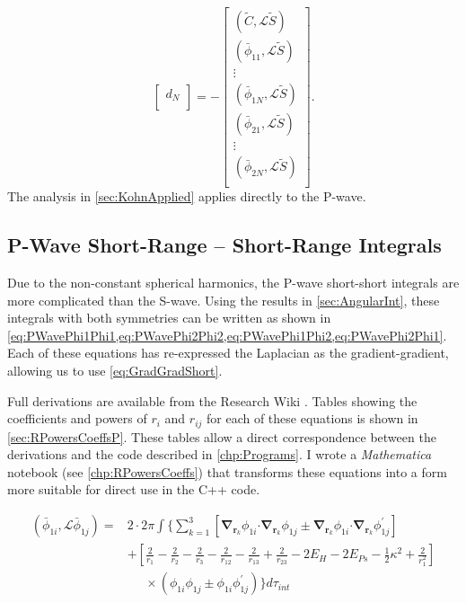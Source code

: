 \documentclass[Dissertation.tex]{subfiles}
\begin{document}
{\begin{equation}
\begin{bmatrix}
	d_N\\
	\end{bmatrix}
	= -
	\begin{bmatrix}
	(\widetilde{C},\mathcal{L}\widetilde{S}) \\
	(\bar{\phi}_{11},\mathcal{L}\widetilde{S}) \\
	\vdots \\
	(\bar{\phi}_{1N},\mathcal{L}\widetilde{S}) \\
	(\bar{\phi}_{21},\mathcal{L}\widetilde{S}) \\
	\vdots \\
	(\bar{\phi}_{2N},\mathcal{L}\widetilde{S}) \\
	\end{bmatrix}.
\end{equation}
}
The analysis in \cref{sec:KohnApplied} applies directly to the P-wave.


\subsection{P-Wave Short-Range -- Short-Range Integrals}
\label{sec:PWaveShortShort}

Due to the non-constant spherical harmonics, the P-wave short-short integrals
are more complicated than the S-wave. Using the results in \cref{sec:AngularInt},
these integrals with both symmetries can be written as shown in
\cref{eq:PWavePhi1Phi1,eq:PWavePhi2Phi2,eq:PWavePhi1Phi2,eq:PWavePhi2Phi1}.
Each of these equations has re-expressed the Laplacian as the gradient-gradient,
allowing us to use \cref{eq:GradGradShort}.

Full derivations are available from the Research Wiki \cite{Wiki}.
Tables showing the coefficients and powers of $r_i$ and $r_{ij}$ for each of 
these equations is shown in \cref{sec:RPowersCoeffsP}. These tables allow a 
direct correspondence between the derivations and the code described in
\cref{chp:Programs}. I wrote a \emph{Mathematica} notebook
(see \cref{chp:RPowersCoeffs}) that transforms
these equations into a form more suitable for direct use in the C++ code.


\begin{align}
\label{eq:PWavePhi1Phi1}
\left(\bar{\phi}_{1i},\mathcal{L} \bar{\phi}_{1j}\right) = &2 \cdot 2\pi \int{ \Bigg\{ \sum_{k=1}^3 \left[ \boldsymbol{\nabla}_{\!\mathbf{r}_k} \nonumber \phi_{1i} \boldsymbol{\cdot} \boldsymbol{\nabla}_{\!\mathbf{r}_k} \phi_{1j} \pm \boldsymbol{\nabla}_{\!\mathbf{r}_k} \phi_{1i} \boldsymbol{\cdot} \boldsymbol{\nabla}_{\!\mathbf{r}_k} \phi_{1j}^\prime \right] } \\
\nonumber  &+ \left. \left[\frac{2}{r_1} - \frac{2}{r_2} - \frac{2}{r_3} - \frac{2}{r_{12}} - \frac{2}{r_{13}} + \frac{2}{r_{23}} - 2 E_H - 2 E_{Ps} - \frac{1}{2}\kappa^2 + \frac{2}{r_1^2} \right] \right. \\
 &\;\;\;\;\; \times \left(\phi_{1i} \phi_{1j} \pm \phi_{1i} \phi_{1j}^\prime \right) \Bigg\} d\tau_{int}
\end{align}
\end{document}
